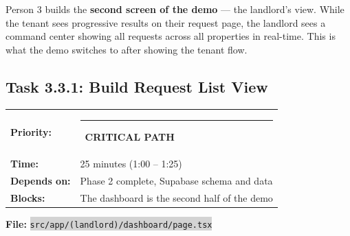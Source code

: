 \documentclass[11pt, a4paper]{article}
\newcommand{\critical}{\textcolor{critred}{\rule{6pt}{6pt}}~\textcolor{critred}{\scriptsize\textbf{CRITICAL PATH}}}
\newcommand{\code}[1]{\texttt{\small\colorbox{lightgray}{#1}}}
\begin{document}
Person 3 builds the \textbf{second screen of the demo} --- the landlord's view. While the tenant sees progressive results on their request page, the landlord sees a command center showing all requests across all properties in real-time. This is what the demo switches to after showing the tenant flow.

\vspace{0.5em}

\subsection{Task 3.3.1: Build Request List View}

\begin{tabularx}{\textwidth}{lX}
\textbf{Priority:} & \critical \\
\textbf{Time:} & 25 minutes (1:00 -- 1:25) \\
\textbf{Depends on:} & Phase 2 complete, Supabase schema and data \\
\textbf{Blocks:} & The dashboard is the second half of the demo \\
\end{tabularx}

\vspace{0.3em}

\textbf{File:} \code{src/app/(landlord)/dashboard/page.tsx}
\end{document}

